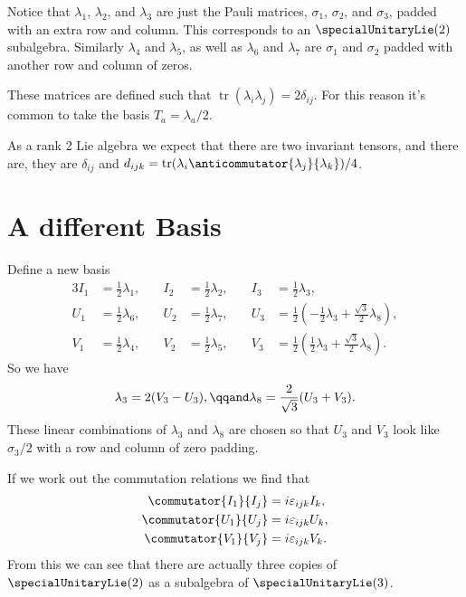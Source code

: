 \documentclass[fleqn]{NotesClass}
\DeclareMathOperator{\tr}{tr}
\begin{document}
    Notice that \(\lambda_1\), \(\lambda_2\), and \(\lambda_3\) are just the Pauli matrices, \(\sigma_1\), \(\sigma_2\), and \(\sigma_3\), padded with an extra row and column.
    This corresponds to an \(\specialUnitaryLie(2)\) subalgebra.
    Similarly \(\lambda_4\) and \(\lambda_5\), as well as \(\lambda_6\) and \(\lambda_7\) are \(\sigma_1\) and \(\sigma_2\) padded with another row and column of zeros.
    
    These matrices are defined such that \(\tr(\lambda_i \lambda_j) = 2\delta_{ij}\).
    For this reason it's common to take the basis \(T_a = \lambda_a/2\).
    
    As a rank 2 Lie algebra we expect that there are two invariant tensors, and there are, they are \(\delta_{ij}\) and \(d_{ijk} = \tr(\lambda_i \anticommutator{\lambda_j}{\lambda_k})/4\).
    
    \section{A different Basis}
    Define a new basis
    \begingroup
    \allowdisplaybreaks
    \begin{alignat}{3}
        I_1 &= \frac{1}{2}\lambda_1, \quad & I_2 &= \frac{1}{2}\lambda_2, \quad & I_3 &= \frac{1}{2}\lambda_3,\\
        U_1 &= \frac{1}{2}\lambda_6, \quad & U_2 &= \frac{1}{2}\lambda_7, \quad & U_3 &= \frac{1}{2}\left( -\frac{1}{2}\lambda_3 + \frac{\sqrt{3}}{2}\lambda_8 \right),\\
        V_1 &= \frac{1}{2}\lambda_4, \quad & V_2 &= \frac{1}{2}\lambda_5, \quad & V_3 &= \frac{1}{2}\left( \frac{1}{2}\lambda_3 + \frac{\sqrt{3}}{2} \lambda_8 \right).
    \end{alignat}
    \endgroup
    So we have 
    \begin{equation}
        \lambda_3 = 2(V_3 - U_3), \qqand \lambda_8 = \frac{2}{\sqrt{3}}(U_3 + V_3).
    \end{equation}
    These linear combinations of \(\lambda_3\) and \(\lambda_8\) are chosen so that \(U_3\) and \(V_3\) look like \(\sigma_3/2\) with a row and column of zero padding.
    
    If we work out the commutation relations we find that
    \begin{align}
        \commutator{I_1}{I_j} &= i\varepsilon_{ijk}I_k,\\
        \commutator{U_1}{U_j} &= i\varepsilon_{ijk}U_k,\\
        \commutator{V_1}{V_j} &= i\varepsilon_{ijk}V_k.
    \end{align}
    From this we can see that there are actually three copies of \(\specialUnitaryLie(2)\) as a subalgebra of \(\specialUnitaryLie(3)\).
    
\end{document}
